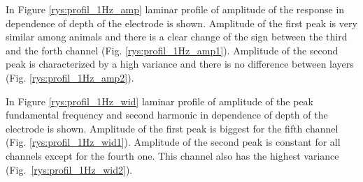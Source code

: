 \documentclass{pracalicmgr}
\begin{document}
    In Figure \ref{rys:profil_1Hz_amp} laminar profile of amplitude of the response in dependence of depth of the electrode is shown. Amplitude of the first peak is very similar among animals and there is a clear change of the sign between the third and the forth channel (Fig. \ref{rys:profil_1Hz_amp1}). Amplitude of the second peak is characterized by a high variance and there is no difference between layers (Fig. \ref{rys:profil_1Hz_amp2}).
    
    
    In Figure \ref{rys:profil_1Hz_wid} laminar profile of amplitude of the peak fundamental frequency and second harmonic in dependence of depth of the electrode is shown. Amplitude of the first peak is biggest for the fifth channel (Fig. \ref{rys:profil_1Hz_wid1}). Amplitude of the second peak is constant for all channels except for the fourth one. This channel also has the highest variance (Fig.~\ref{rys:profil_1Hz_wid2}).
    
\end{document}
